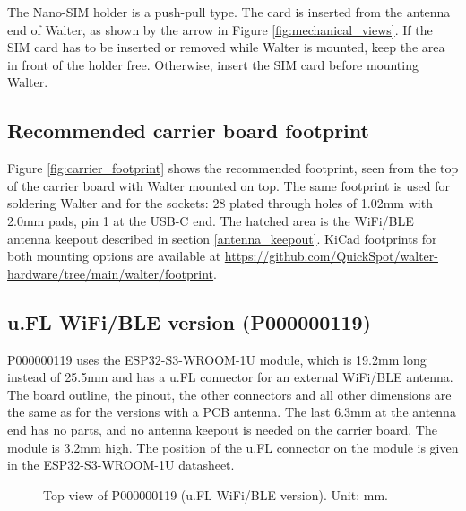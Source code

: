 \documentclass[11pt]{article}
\begin{document}
The Nano-SIM holder is a push-pull type. The card is inserted from the antenna end of Walter, as shown by the arrow in Figure \ref{fig:mechanical_views}. If the SIM card has to be inserted or removed while Walter is mounted, keep the area in front of the holder free. Otherwise, insert the SIM card before mounting Walter.

\subsection{Recommended carrier board footprint} \label{carrier_footprint}
Figure \ref{fig:carrier_footprint} shows the recommended footprint, seen from the top of the carrier board with Walter mounted on top. The same footprint is used for soldering Walter and for the sockets: 28 plated through holes of 1.02mm with 2.0mm pads, pin 1 at the USB-C end. The hatched area is the WiFi/BLE antenna keepout described in section \ref{antenna_keepout}. KiCad footprints for both mounting options are available at \url{https://github.com/QuickSpot/walter-hardware/tree/main/walter/footprint}.

\subsection{u.FL WiFi/BLE version (P000000119)} \label{mech_ufl}
P000000119 uses the ESP32-S3-WROOM-1U module, which is 19.2mm long instead of 25.5mm and has a u.FL connector for an external WiFi/BLE antenna. The board outline, the pinout, the other connectors and all other dimensions are the same as for the versions with a PCB antenna. The last 6.3mm at the antenna end has no parts, and no antenna keepout is needed on the carrier board. The module is 3.2mm high. The position of the u.FL connector on the module is given in the ESP32-S3-WROOM-1U datasheet.

\begin{figure}[H]
\centering
\begin{minipage}[b]{0.52\textwidth}
\centering

\caption{Recommended carrier board footprint. Unit: mm.}
\label{fig:carrier_footprint}
\end{minipage}
\hfill
\begin{minipage}[b]{0.44\textwidth}
\centering

\caption{Top view of P000000119 (u.FL WiFi/BLE version). Unit: mm.}
\label{fig:mechanical_ufl}
\end{minipage}
\end{figure}
\end{document}
